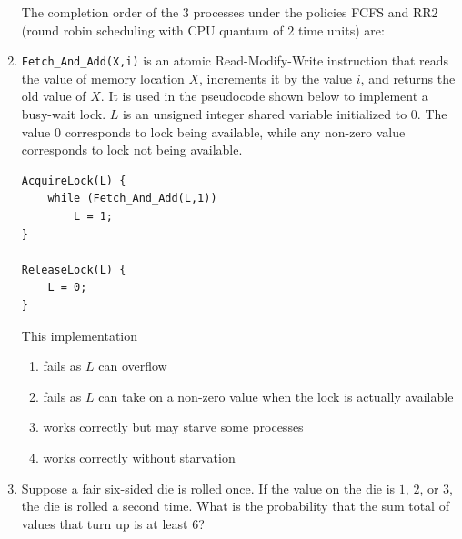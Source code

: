 \documentclass[journal]{IEEEtran}
\numberwithin{equation}{enumi}
\numberwithin{figure}{enumi}
\begin{document}
\begin{enumerate}
The completion order of the $3$ processes under the policies FCFS and RR$2$ (round robin scheduling with CPU quantum of $2$ time units) are:

\begin{enumerate}
\end{enumerate}

\item \texttt{Fetch\_And\_Add(X,i)} is an atomic Read-Modify-Write instruction that reads the value of memory location $X$, increments it by the value $i$, and returns the old value of $X$.  
It is used in the pseudocode shown below to implement a busy-wait lock.  
$L$ is an unsigned integer shared variable initialized to $0$.  
The value $0$ corresponds to lock being available, while any non-zero value corresponds to lock not being available.

\begin{verbatim}
AcquireLock(L) {
    while (Fetch_And_Add(L,1))
        L = 1;
}

ReleaseLock(L) {
    L = 0;
}
\end{verbatim}

This implementation

\begin{enumerate}
    \item fails as $L$ can overflow
    \item fails as $L$ can take on a non-zero value when the lock is actually available
    \item works correctly but may starve some processes
    \item works correctly without starvation
\end{enumerate}

\item Suppose a fair six-sided die is rolled once.  
If the value on the die is $1$, $2$, or $3$, the die is rolled a second time.  
What is the probability that the sum total of values that turn up is at least $6$?

\begin{enumerate}
\end{enumerate}
 

\end{enumerate}
\end{document}
